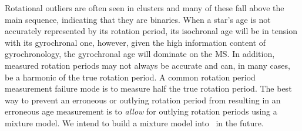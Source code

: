 Rotational outliers are often seen in clusters \citep[see \eg][]{douglas2016,
rebull2016, douglas2017, rebull2017} and many of these fall above the main
sequence, indicating that they are binaries.
When a star's age is not accurately represented by its rotation period, its
isochronal age will be in tension with its gyrochronal one, however, given the
high information content of gyrochronology, the gyrochronal age will dominate
on the MS.
In addition, measured rotation periods may not always be accurate and can, in
many cases, be a harmonic of the true rotation period.
A common rotation period measurement failure mode is to measure half the true
rotation period.
The best way to prevent an erroneous or outlying rotation period from
resulting in an erroneous age measurement is to {\it allow} for outlying
rotation periods using a mixture model.
We intend to build a mixture model into \sd\ in the future.


